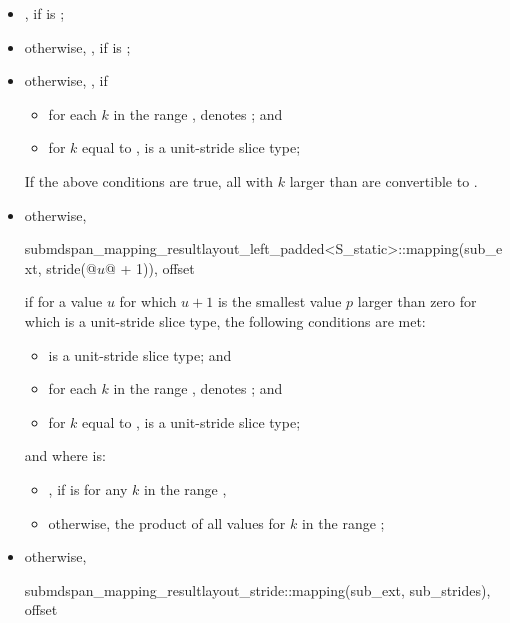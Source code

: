 \begin{itemdescr}
\pnum
\returns
\begin{itemize}
\item
{},
if  is ;
\item
otherwise,
,\newline
if  is ;
\item
otherwise,
,
if
  \begin{itemize}
  \item
  for each $k$ in the range ,
   denotes ; and
  \item
  for $k$ equal to ,
   is a unit-stride slice type;
  \end{itemize}
\begin{note}
If the above conditions are true,
all  with $k$ larger than 
are convertible to .
\end{note}
\item
otherwise,
\begin{codeblock}
submdspan_mapping_result{layout_left_padded<S_static>::mapping(sub_ext, stride(@$u$@ + 1)),
                         offset}
\end{codeblock}
if for a value $u$ for which $u+1$ is
the smallest value $p$ larger than zero
for which  is a unit-stride slice type,
the following conditions are met:
\begin{itemize}
\item
{} is a unit-stride slice type; and
\item
for each $k$ in the range ,
 denotes ; and
\item
for $k$ equal to ,
 is a unit-stride slice type;
\end{itemize}
and where  is:
\begin{itemize}
\item
{},
if  is 
for any $k$ in the range ,
\item
otherwise, the product of all values
 for $k$ in the range ;
\end{itemize}
\item
otherwise,
\begin{codeblock}
submdspan_mapping_result{layout_stride::mapping(sub_ext, sub_strides), offset}
\end{codeblock}
\end{itemize}
\end{itemdescr}

